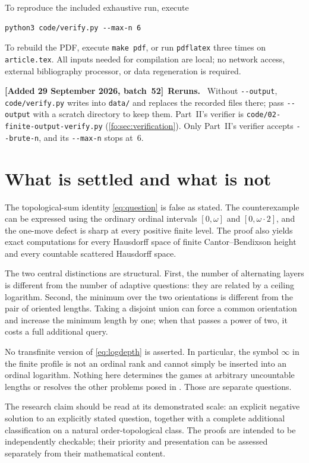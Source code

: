\documentclass[11pt,letterpaper]{article}
\numberwithin{equation}{section}
\theoremstyle{definition}
\theoremstyle{remark}
\theoremstyle{definition}
\newenvironment{writenote}[1][]{\par\smallskip\begingroup\small\sloppy
 \noindent\textbf{[Added 29 September 2026, batch~52]}\if\relax\detokenize{#1}\relax\else~\textbf{#1.}\fi\ }%
 {\par\endgroup\smallskip}
\begin{document}
To reproduce the included exhaustive run, execute
\begin{lstlisting}
python3 code/verify.py --max-n 6
\end{lstlisting}
To rebuild the PDF, execute \texttt{make pdf}, or run \texttt{pdflatex} three times on
\texttt{article.tex}. All inputs needed for compilation are local; no network
access, external bibliography processor, or data regeneration is required.

\begin{writenote}[Reruns]
Without \texttt{-{}-output}, \texttt{code/verify.py} writes into \texttt{data/}
and replaces the recorded files there; pass \texttt{-{}-output} with a scratch
directory to keep them. Part~II's verifier is
\texttt{code/02-finite-output-verify.py} (\cref{fo:sec:verification}). Only
Part~II's verifier accepts \texttt{-{}-brute-n}, and its \texttt{-{}-max-n} stops
at~6.
\end{writenote}

\section{What is settled and what is not}

The topological-sum identity \eqref{eq:question} is false as stated. The
counterexample can be expressed using the ordinary ordinal intervals
$[0,\omega]$ and $[0,\omega\cdot2]$, and the one-move defect is sharp at every
positive finite level. The proof also yields exact computations for every
Hausdorff space of finite Cantor--Bendixson height and every countable scattered
Hausdorff space.

The two central distinctions are structural. First, the number of alternating
layers is different from the number of adaptive questions: they are related
by a ceiling logarithm. Second, the minimum over the two orientations is
different from the pair of oriented lengths. Taking a disjoint union can force
a common orientation and increase the minimum length by one; when that passes
a power of two, it costs a full additional query.

No transfinite version of \eqref{eq:logdepth} is asserted. In particular, the
symbol $\infty$ in the finite profile is not an ordinal rank and cannot simply
be inserted into an ordinal logarithm. Nothing here determines the games at
arbitrary uncountable lengths or resolves the other problems posed in
\cite{CCS}. Those are separate questions.

The research claim should be read at its demonstrated scale: an explicit
negative solution to an explicitly stated question, together with a complete additional
classification on a natural order-topological class. The proofs are intended
to be independently checkable; their priority and presentation can be assessed
separately from their mathematical content.
\end{document}
